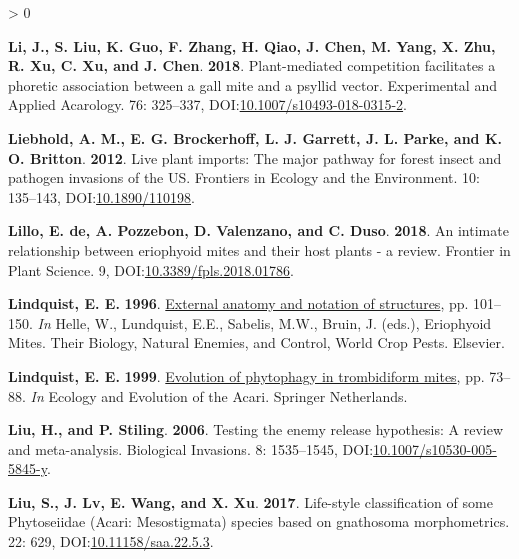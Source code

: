 \documentclass{ufdissertation}[overrideChapters] %
\newlength{\cslhangindent}
\newenvironment{CSLReferences}[2] %
 {%
  \setlength{\parindent}{0pt}
  \ifodd #1 \everypar{\setlength{\hangindent}{\cslhangindent}}\ignorespaces\fi
  \ifnum #2 > 0
  \setlength{\parskip}{#2\baselineskip}
  \fi
 }%
 {}
\begin{document}
{\begin{CSLReferences}{1}{1}
\leavevmode{}%
\textbf{Li, J., S. Liu, K. Guo, F. Zhang, H. Qiao, J. Chen, M. Yang, X. Zhu, R. Xu, C. Xu, and J. Chen}. \textbf{2018}. Plant-mediated competition facilitates a phoretic association between a gall mite and a psyllid vector. Experimental and Applied Acarology. 76: 325--337, DOI:\href{https://doi.org/10.1007/s10493-018-0315-2}{10.1007/s10493-018-0315-2}.

\leavevmode{}%
\textbf{Liebhold, A. M., E. G. Brockerhoff, L. J. Garrett, J. L. Parke, and K. O. Britton}. \textbf{2012}. Live plant imports: The major pathway for forest insect and pathogen invasions of the {US}. Frontiers in Ecology and the Environment. 10: 135--143, DOI:\href{https://doi.org/10.1890/110198}{10.1890/110198}.

\leavevmode{}%
\textbf{Lillo, E. de, A. Pozzebon, D. Valenzano, and C. Duso}. \textbf{2018}. An intimate relationship between eriophyoid mites and their host plants - a review. Frontier in Plant Science. 9, DOI:\href{https://doi.org/10.3389/fpls.2018.01786}{10.3389/fpls.2018.01786}.

\leavevmode{}%
\textbf{Lindquist, E. E.} \textbf{1996}. \href{https://doi.org/10.1016/s1572-4379(96)80006-6}{External anatomy and notation of structures}, pp. 101--150. \emph{In} Helle, W., Lundquist, E.E., Sabelis, M.W., Bruin, J. (eds.), Eriophyoid Mites. Their Biology, Natural Enemies, and Control, World Crop Pests. Elsevier.

\leavevmode{}%
\textbf{Lindquist, E. E.} \textbf{1999}. \href{https://doi.org/10.1007/978-94-017-1343-6_4}{Evolution of phytophagy in trombidiform mites}, pp. 73--88. \emph{In} Ecology and Evolution of the Acari. Springer Netherlands.

\leavevmode{}%
\textbf{Liu, H., and P. Stiling}. \textbf{2006}. Testing the enemy release hypothesis: A review and meta-analysis. Biological Invasions. 8: 1535--1545, DOI:\href{https://doi.org/10.1007/s10530-005-5845-y}{10.1007/s10530-005-5845-y}.

\leavevmode{}%
\textbf{Liu, S., J. Lv, E. Wang, and X. Xu}. \textbf{2017}. Life-style classification of some {Phytoseiidae} ({Acari}: {Mesostigmata}) species based on gnathosoma morphometrics. 22: 629, DOI:\href{https://doi.org/10.11158/saa.22.5.3}{10.11158/saa.22.5.3}.


\end{CSLReferences}}
\end{document}
